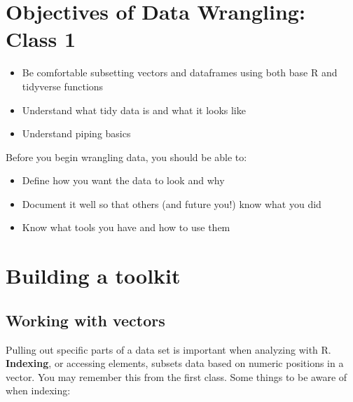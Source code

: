 \documentclass[
  letterpaper,
  DIV=11,
  numbers=noendperiod]{scrreprt}
\begin{document}
\section{Objectives of Data Wrangling: Class
1}\label{objectives-of-data-wrangling-class-1}

\begin{itemize}
\item
  Be comfortable subsetting vectors and dataframes using both base R and
  tidyverse functions
\item
  Understand what tidy data is and what it looks like
\item
  Understand piping basics
\end{itemize}

\begin{tcolorbox}[enhanced jigsaw, bottomtitle=1mm, bottomrule=.15mm, toprule=.15mm, opacityback=0, leftrule=.75mm, breakable, colback=white, toptitle=1mm, left=2mm, coltitle=black, titlerule=0mm, opacitybacktitle=0.6, title=\textcolor{quarto-callout-note-color}{\faInfo}\hspace{0.5em}{Measure twice, cut once}, rightrule=.15mm, arc=.35mm, colframe=quarto-callout-note-color-frame, colbacktitle=quarto-callout-note-color!10!white]

Before you begin wrangling data, you should be able to:

\begin{itemize}
\item
  Define how you want the data to look and why
\item
  Document it well so that others (and future you!) know what you did
\item
  Know what tools you have and how to use them
\end{itemize}

\end{tcolorbox}

\section{Building a toolkit}\label{building-a-toolkit}

\subsection{Working with vectors}\label{working-with-vectors}

Pulling out specific parts of a data set is important when analyzing
with R. \textbf{Indexing}, or accessing elements, subsets data based on
numeric positions in a vector. You may remember this from the first
class. Some things to be aware of when indexing:
\end{document}
